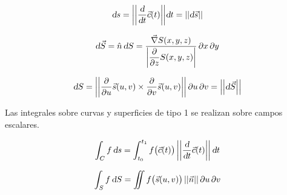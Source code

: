 \begin{mdframed}[style=DefinitionFrame]
    \begin{defn}
    \end{defn}
    \begin{equation*}
        \textsl{d} s = {\left|\left| { \dfrac{\textsl{d}}{\textsl{d} t} \Vec{c}(t) } \right|\right|} \textsl{d} t = {\left|\left| { \textsl{d} \Vec{s} } \right|\right|}
    \end{equation*}
\end{mdframed}

\begin{mdframed}[style=DefinitionFrame]
    \begin{defn}
    \end{defn}
    \begin{equation*}
        \textsl{d} \Vec{S} = \hat{n} \, \textsl{d} S = \dfrac{\Vec{\nabla} S(x,y,z)}{{\left| { \dfrac{\partial}{\partial z} S(x,y,z) } \right|} } \, \partial x \, \partial y
    \end{equation*}
\end{mdframed}

\begin{mdframed}[style=DefinitionFrame]
    \begin{defn}
    \end{defn}
    \begin{equation*}
        \textsl{d} S = {\left|\left| { \dfrac{\partial}{\partial u} \Vec{s}(u,v) \times \dfrac{\partial}{\partial v} \Vec{s}(u,v) } \right|\right|} \, \partial u \, \partial v = {\left|\left| { \textsl{d} \Vec{S} } \right|\right|}
    \end{equation*}
\end{mdframed}



Las integrales sobre curvas y superficies de tipo 1 se realizan sobre campos escalares.

\begin{mdframed}[style=DefinitionFrame]
    \begin{defn}
    \end{defn}
    \begin{equation*}
        \int_C f \, \textsl{d} s = \int_{t_0}^{t_1} f \big( \Vec{c}(t) \big) \, {\left|\left| { \dfrac{\textsl{d}}{\textsl{d} t} \Vec{c}(t) } \right|\right|} \, \textsl{d} t
    \end{equation*}
\end{mdframed}

\begin{mdframed}[style=DefinitionFrame]
    \begin{defn}
    \end{defn}
    \begin{equation*}
        \int_S f \, \textsl{d} S = \iint f \big( \Vec{s}(u,v) \big) \, {\left|\left| { \Vec{n} } \right|\right|} \, \partial u \, \partial v
    \end{equation*}
\end{mdframed}


